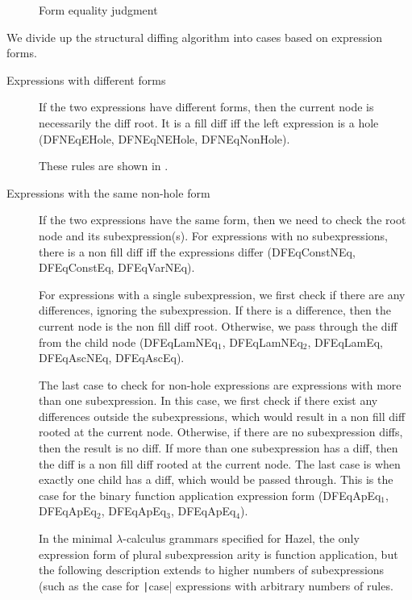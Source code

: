 \begin{figure}
  \centering
  \begin{mdframed}
    \begin{singlespace}
      
    \end{singlespace}
  \end{mdframed}
  \caption{Form equality judgment}
  \label{fig:form-equal}
\end{figure}

We divide up the structural diffing algorithm into cases based on expression forms.

\begin{description}
\item[Expressions with different forms] If the two expressions have different forms, then the current node is necessarily the diff root. It is a fill diff iff the left expression is a hole (DFNEqEHole, DFNEqNEHole, DFNEqNonHole).

  These rules are shown in .
  
\item[Expressions with the same non-hole form] If the two expressions have the same form, then we need to check the root node and its subexpression(s). For expressions with no subexpressions, there is a non fill diff iff the expressions differ (DFEqConstNEq, DFEqConstEq, DFEqVarNEq).
  
  For expressions with a single subexpression, we first check if there are any differences, ignoring the subexpression. If there is a difference, then the current node is the non fill diff root. Otherwise, we pass through the diff from the child node (DFEqLamNEq$_1$, DFEqLamNEq$_2$, DFEqLamEq, DFEqAscNEq, DFEqAscEq).

  The last case to check for non-hole expressions are expressions with more than one subexpression. In this case, we first check if there exist any differences outside the subexpressions, which would result in a non fill diff rooted at the current node. Otherwise, if there are no subexpression diffs, then the result is no diff. If more than one subexpression has a diff, then the diff is a non fill diff rooted at the current node. The last case is when exactly one child has a diff, which would be passed through. This is the case for the binary function application expression form (DFEqApEq$_1$, DFEqApEq$_2$, DFEqApEq$_3$, DFEqApEq$_4$).

  In the minimal $\lambda$-calculus grammars specified for Hazel, the only expression form of plural subexpression arity is function application, but the following description extends to higher numbers of subexpressions (such as the case for \texttt|case| expressions with arbitrary numbers of rules.


\end{description}
